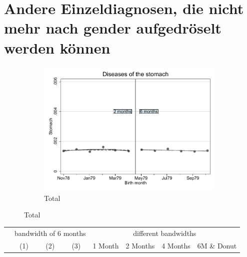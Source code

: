 \documentclass[a4paper ]{article}
\begin{document}
\section{Andere Einzeldiagnosen, die nicht mehr nach gender aufgedröselt werden können}
\begin{figure}[h]
	\centering
	\begin{subfigure}[t]{0.5\textwidth}
		\centering
		\includegraphics[width=0.99\textwidth]{R1_RD_Stomach_fits}
		\caption{Total}		
	\end{subfigure}
\end{figure}


\begin{table}[h]\centering
\def\sym#1{\ifmmode^{#1}\else\(^{#1}\)\fi}
\begin{tabular}{l*{3}{c}|cccc}
\toprule
&\multicolumn{3}{c}{bandwidth of 6 months} & \multicolumn{4}{c}{different bandwidths} \\
 \cmidrule(lr{1em}){2-4} \cmidrule(lr{1em}){5-8}
 &\multicolumn{1}{c}{(1)}&\multicolumn{1}{c}{(2)}&\multicolumn{1}{c}{(3)}& 1 Month & 2 Months & 4 Months & 6M \& Donut \\
\midrule 

\bottomrule
\end{tabular}
\end{table}
\end{document}
